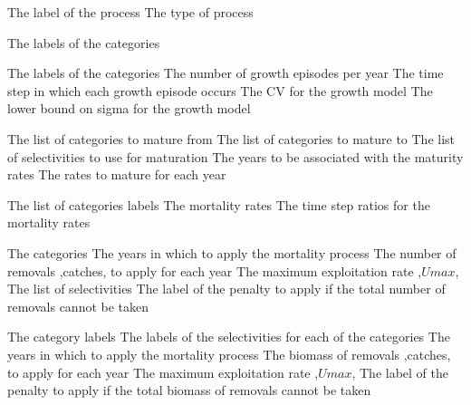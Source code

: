  {The label of the process}
 {The type of process}
\par\textbf{}\par
{} {The labels of the categories}
\par\textbf{}\par
{} {The labels of the categories}
 {The number of growth episodes per year}
 {The time step in which each growth episode occurs}
 {The CV for the growth model}
 {The lower bound on sigma for the growth model}
\par\textbf{}\par
{} {The list of categories to mature from}
 {The list of categories to mature to}
 {The list of selectivities to use for maturation}
 {The years to be associated with the maturity rates}
 {The rates to mature for each year}
\par\textbf{}\par
{} {The list of categories labels}
 {The mortality rates}
 {The time step ratios for the mortality rates}
\par\textbf{}\par
{} {The categories}
 {The years in which to apply the mortality process}
 {The number of removals ,catches, to apply for each year}
 {The maximum exploitation rate ,$Umax$,}
 {The list of selectivities}
 {The label of the penalty to apply if the total number of removals cannot be taken}
\par\textbf{}\par
{} {The category labels}
 {The labels of the selectivities for each of the categories}
 {The years in which to apply the mortality process}
 {The biomass of removals ,catches, to apply for each year}
 {The maximum exploitation rate ,$Umax$,}
 {The label of the penalty to apply if the total biomass of removals cannot be taken}
